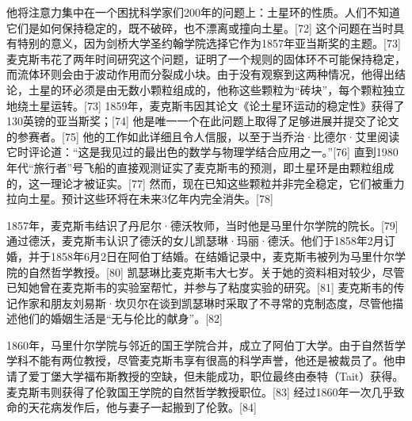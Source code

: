 他将注意力集中在一个困扰科学家们200年的问题上：土星环的性质。人们不知道它们是如何保持稳定的，既不破碎，也不漂离或撞向土星。[72] 这个问题在当时具有特别的意义，因为剑桥大学圣约翰学院选择它作为1857年亚当斯奖的主题。[73] 麦克斯韦花了两年时间研究这个问题，证明了一个规则的固体环不可能保持稳定，而流体环则会由于波动作用而分裂成小块。由于没有观察到这两种情况，他得出结论，土星的环必须是由无数小颗粒组成的，他称这些颗粒为“砖块”，每个颗粒独立地绕土星运转。[73] 1859年，麦克斯韦因其论文《论土星环运动的稳定性》获得了130英镑的亚当斯奖；[74] 他是唯一一个在此问题上取得了足够进展并提交了论文的参赛者。[75] 他的工作如此详细且令人信服，以至于当乔治·比德尔·艾里阅读它时评论道：“这是我见过的最出色的数学与物理学结合应用之一。”[76] 直到1980年代“旅行者”号飞船的直接观测证实了麦克斯韦的预测，即土星环是由颗粒组成的，这一理论才被证实。[77] 然而，现在已知这些颗粒并非完全稳定，它们被重力拉向土星。预计这些环将在未来3亿年内完全消失。[78]

1857年，麦克斯韦结识了丹尼尔·德沃牧师，当时他是马里什尔学院的院长。[79] 通过德沃，麦克斯韦认识了德沃的女儿凯瑟琳·玛丽·德沃。他们于1858年2月订婚，并于1858年6月2日在阿伯丁结婚。在结婚记录中，麦克斯韦被列为马里什尔学院的自然哲学教授。[80] 凯瑟琳比麦克斯韦大七岁。关于她的资料相对较少，尽管已知她曾在麦克斯韦的实验室帮忙，并参与了粘度实验的研究。[81] 麦克斯韦的传记作家和朋友刘易斯·坎贝尔在谈到凯瑟琳时采取了不寻常的克制态度，尽管他描述他们的婚姻生活是“无与伦比的献身”。[82]

1860年，马里什尔学院与邻近的国王学院合并，成立了阿伯丁大学。由于自然哲学学科不能有两位教授，尽管麦克斯韦享有很高的科学声誉，他还是被裁员了。他申请了爱丁堡大学福布斯教授的空缺，但未能成功，职位最终由泰特（Tait）获得。麦克斯韦则获得了伦敦国王学院的自然哲学教授职位。[83] 经过1860年一次几乎致命的天花病发作后，他与妻子一起搬到了伦敦。[84]